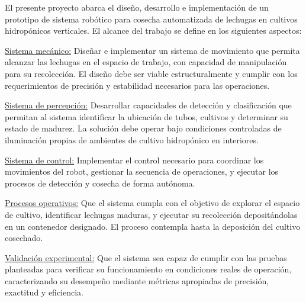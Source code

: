 El presente proyecto abarca el diseño, desarrollo e implementación de un prototipo de sistema robótico para cosecha automatizada de lechugas en cultivos hidropónicos verticales. El alcance del trabajo se define en los siguientes aspectos:

\underline{Sistema mecánico:} Diseñar e implementar un sistema de movimiento que permita alcanzar las lechugas en el espacio de trabajo, con capacidad de manipulación para su recolección. El diseño debe ser viable estructuralmente y cumplir con los requerimientos de precisión y estabilidad necesarios para las operaciones.

\underline{Sistema de percepción:} Desarrollar capacidades de detección y clasificación que permitan al sistema identificar la ubicación de tubos, cultivos y determinar su estado de madurez. La solución debe operar bajo condiciones controladas de iluminación propias de ambientes de cultivo hidropónico en interiores.

\underline{Sistema de control:} Implementar el control necesario para coordinar los movimientos del robot, gestionar la secuencia de operaciones, y ejecutar los procesos de detección y cosecha de forma autónoma.

\underline{Procesos operativos:} Que el sistema cumpla con el objetivo de explorar el espacio de cultivo, identificar lechugas maduras, y ejecutar su recolección depositándolas en un contenedor designado. El proceso contempla hasta la deposición del cultivo cosechado.

\underline{Validación experimental:} Que el sistema sea capaz de cumplir con las pruebas planteadas para verificar su funcionamiento en condiciones reales de operación, caracterizando su desempeño mediante métricas apropiadas de precisión, exactitud y eficiencia.